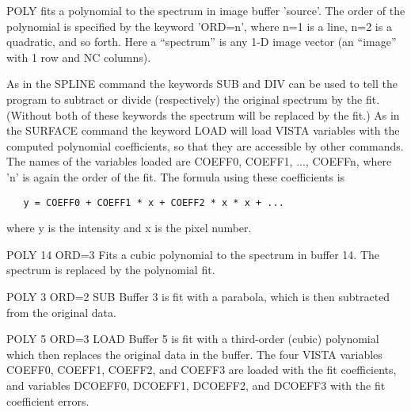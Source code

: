 POLY fits a polynomial to the spectrum in image buffer 'source'.  The order
of the polynomial is specified by the keyword 'ORD=n', where n=1 is a line,
n=2 is a quadratic, and so forth.  Here a ``spectrum'' is any 1-D image
vector (an ``image'' with 1 row and NC columns).

As in the SPLINE command the keywords SUB and DIV can be used to tell the
program to subtract or divide (respectively) the original spectrum by the
fit.  (Without both of these keywords the spectrum will be replaced by the
fit.) As in the SURFACE command the keyword LOAD will load VISTA variables
with the computed polynomial coefficients, so that they are accessible by
other commands.  The names of the variables loaded are COEFF0, COEFF1, ...,
COEFFn, where 'n' is again the order of the fit.  The formula using these
coefficients is
\begin{verbatim}
   y = COEFF0 + COEFF1 * x + COEFF2 * x * x + ...
\end{verbatim}
where y is the intensity and x is the pixel number.

\begin{example}
  \item[POLY 14 ORD=3]{Fits a cubic polynomial to the spectrum in buffer
       14.  The spectrum is replaced by the polynomial fit.}

  \item[POLY 3 ORD=2 SUB]{Buffer 3 is fit with a parabola, which is then
       subtracted from the original data.}

  \item[POLY 5 ORD=3 LOAD]{Buffer 5 is fit with a third-order (cubic)
       polynomial which then replaces the original data in the buffer.  The
       four VISTA variables COEFF0, COEFF1, COEFF2, and COEFF3 are loaded
       with the fit coefficients, and variables DCOEFF0, DCOEFF1, DCOEFF2,
       and DCOEFF3 with the fit coefficient errors.}
\end{example}

